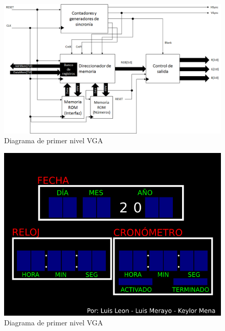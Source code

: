 \documentclass[12pt,a4paper]{article}
\begin{document}
			\begin{figure}[hbtp]
				\centering
				\includegraphics[width=18cm]{img/VGATercerNivel.png}
				\caption{Diagrama de primer nivel VGA}
				\label{fig:vgaTercerNivel}
			\end{figure}
			\begin{figure}[hbtp]
				\centering
				\includegraphics[width=13cm]{img/VGAInterfaz.png}
				\caption{Diagrama de primer nivel VGA}
				\label{fig:vgaInterfaz}
			\end{figure}
		
\end{document}
